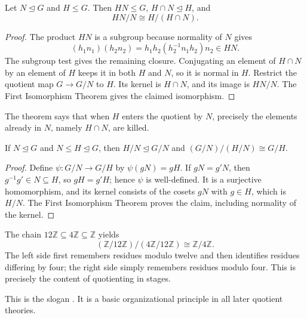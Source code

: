 \begin{theorem}
Let \(N\trianglelefteq G\) and \(H\leq G\).  Then \(HN\leq G\),
\(H\cap N\trianglelefteq H\), and
\[HN/N\cong H/(H\cap N).\]
\end{theorem}
\begin{proof}
The product \(HN\) is a subgroup because normality of \(N\) gives
\[
  (h_1n_1)(h_2n_2)=h_1h_2(h_2^{-1}n_1h_2)n_2\in HN.
\]
The subgroup test gives the remaining closure.  Conjugating an element
of \(H\cap N\) by an element of \(H\) keeps it in both \(H\) and \(N\), so it
is normal in \(H\).  Restrict the quotient map \(G\to G/N\) to \(H\).  Its
kernel is \(H\cap N\), and its image is \(HN/N\).  The First Isomorphism
Theorem gives the claimed isomorphism.
\end{proof}

The theorem says that when \(H\) enters the quotient by \(N\), precisely the
elements already in \(N\), namely \(H\cap N\), are killed.

\begin{theorem}
If \(N\trianglelefteq G\) and \(N\leq H\trianglelefteq G\), then
\(H/N\trianglelefteq G/N\) and \((G/N)/(H/N)\cong G/H\).
\end{theorem}
\begin{proof}
Define \(\psi:G/N\to G/H\) by \(\psi(gN)=gH\).  If \(gN=g'N\), then
\(g^{-1}g'\in N\subseteq H\), so \(gH=g'H\); hence \(\psi\) is well-defined.
It is a surjective homomorphism, and its kernel consists of the cosets \(gN\)
with \(g\in H\), which is \(H/N\).  The First Isomorphism Theorem proves the
claim, including normality of the kernel.
\end{proof}

\begin{example}
The chain \(12\mathbb Z\subseteq4\mathbb Z\subseteq\mathbb Z\) yields
\[(\mathbb Z/12\mathbb Z)/(4\mathbb Z/12\mathbb Z)
\cong\mathbb Z/4\mathbb Z.\]
The left side first remembers residues modulo twelve and then identifies
residues differing by four; the right side simply remembers residues modulo
four.  This is precisely the content of quotienting in stages.
\end{example}

This is the slogan .  It is a basic organizational principle in all later quotient theories.

